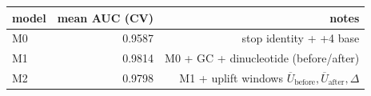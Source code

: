 \begin{center}
\small
\setlength{\tabcolsep}{6pt}
\renewcommand{\arraystretch}{1.15}
\begin{tabular}{lrr}
\toprule
model & mean AUC (CV) & notes \\
\midrule
M0 & 0.9587 & stop identity + +4 base \\
M1 & 0.9814 & M0 + GC + dinucleotide (before/after) \\
M2 & 0.9798 & M1 + uplift windows $\overline{U}_{\mathrm{before}},\overline{U}_{\mathrm{after}},\Delta$ \\
\bottomrule
\end{tabular}
\end{center}

